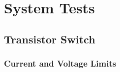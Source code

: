 \chapter{System Tests}

\section{Transistor Switch}

\subsection{Current and Voltage Limits}

\subsection{}
